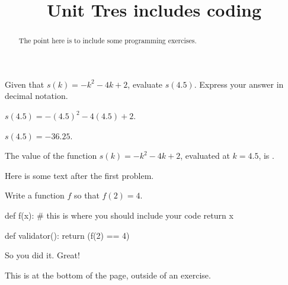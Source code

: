 \documentclass{ximera}
\title{Unit Tres includes coding}
\begin{document}
\begin{abstract}
  The point here is to include some programming exercises.
\end{abstract}

\begin{exercise}
Given that $s(k)=-k^2-4 k+2$, evaluate $s(4.5)$. Express your answer in decimal notation.
\begin{solution}
\begin{hint}
$s(4.5)=-(4.5)^2-4 (4.5)+2$.
\end{hint}
\begin{hint}
$s(4.5)=-36.25$.
\end{hint}
The value of the function $s(k)=-k^2-4 k+2$, evaluated at $k=4.5$, is .
\end{solution}

Here is some text after the first problem.
\end{exercise}

\begin{exercise}
Write a function $f$ so that $f(2) = 4$.

\begin{solution}
\begin{python}
def f(x):
  # this is where you should include your code
  return x

def validator():
  return (f(2) == 4)
\end{python}
\end{solution}

So you did it.  Great!
\end{exercise}

This is at the bottom of the page, outside of an exercise.
\end{document}
